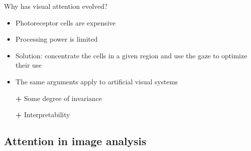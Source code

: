 \documentclass[xcolor=pdftex,dvipsnames,table,mathserif]{beamer}
\begin{document}
\begin{frame}{Why has visual attention evolved?}

  \begin{itemize}
  \item Photoreceptor cells are expensive
  \item Processing power is limited
  \item Solution: concentrate the cells in a given region and use the gaze to optimize their use
  \end{itemize}

\pause

  \begin{alertblock}{}
    \begin{itemize}
    \item The same arguments apply to artificial visual systems
    \item[\textbf{+}] Some degree of invariance
    \item[\textbf{+}] Interpretability
    \end{itemize}
  \end{alertblock}

\end{frame}


\subsection{Attention in image analysis}
\end{document}
